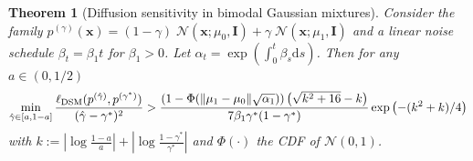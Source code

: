 \documentclass[11pt]{article}
\newcommand{\becca}[1]{\textcolor{dkred}{[becca: #1]}}
\newcommand{\btodo}[1]{\textcolor{red}{[to do: #1]}}
\newcommand{\fitparenth}[1]{\left(#1\right)}
\newcommand{\vect}[1]{\mathbf{#1}}
\newcommand{\CalN}{\mathcal{N}}
\theoremstyle{plain}
\newtheorem{theorem}{Theorem}[section]
\newcommand{\1}{\mathbbm{1}}
\DeclarePairedDelimiter{\norm}{\lVert}{\rVert}
\DeclarePairedDelimiter{\set}{\lbrace}{\rbrace}
\newcommand{\btheta}{{\boldsymbol{\theta}}}
\newcommand{\vx}{\vect{x}}
\newcommand{\vs}{\vect{s}}
\newcommand{\ldsm}{\ell_\mathrm{DSM}}
\newcommand{\pdist}[2][]{p_{#1}^{(#2)}}
\begin{document}
\begin{theorem}[Diffusion sensitivity in bimodal Gaussian mixtures]\label{thm: GMM Sensitivity Emerges}
Consider the family $\pdist{\gamma}(\vx) =(1-\gamma) \; \CalN(\vx; \mu_0, \vect I)  + \gamma \;\CalN(\vx; \mu_1, \vect I)$ and a linear noise schedule $\beta_t=\beta_1 t$ for $\beta_1>0$. 
Let $\alpha_t=\exp\fitparenth{\int_0^t\beta_s \mathrm{d}s}$. %
Then for any $a \in (0,1/2)$
\begin{align}
   \min_{\hat \gamma \in [a,1-a]}\frac{\ldsm(\pdist{\hat\gamma},\pdist{\gamma^*})}{(\hat\gamma-\gamma^*)^2}>\frac{(1-\Phi(\norm{\mu_1-\mu_0}\sqrt{\alpha_1}))\fitparenth{\sqrt{k^2+16}-k}}{7\beta_1\gamma^*(1-\gamma^*)}\exp\fitparenth{-(k^2+k)/4} 
   \label{eq:main_thm}
\end{align}
with $k:=\left|\log \frac{1-a}{a}\right|+\left|\log\frac{1-\gamma^*}{\gamma^*}\right|$ and $\Phi(\cdot)$ the CDF of $\mathcal{N}(0,1)$. 



\end{theorem}
\end{document}
